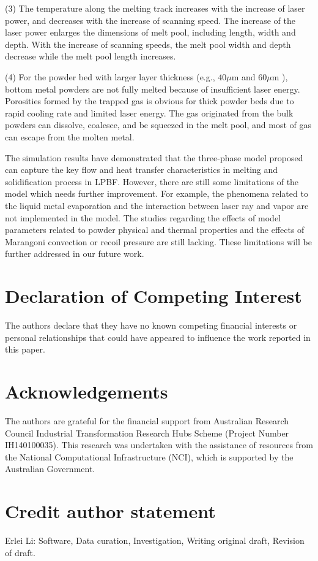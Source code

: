 \documentclass[10pt]{article}
\begin{document}
(3) The temperature along the melting track increases with the increase of laser power, and decreases with the increase of scanning speed. The increase of the laser power enlarges the dimensions of melt pool, including length, width and depth. With the increase of scanning speeds, the melt pool width and depth decrease while the melt pool length increases.

(4) For the powder bed with larger layer thickness (e.g., $40 \mu \mathrm{m}$ and $60 \mu \mathrm{m}$ ), bottom metal powders are not fully melted because of insufficient laser energy. Porosities formed by the trapped gas is obvious for thick powder beds due to rapid cooling rate and limited laser energy. The gas originated from the bulk powders can dissolve, coalesce, and be squeezed in the melt pool, and most of gas can escape from the molten metal.

The simulation results have demonstrated that the three-phase model proposed can capture the key flow and heat transfer characteristics in melting and solidification process in LPBF. However, there are still some limitations of the model which needs further improvement. For example, the phenomena related to the liquid metal evaporation and the interaction between laser ray and vapor are not implemented in the model. The studies regarding the effects of model parameters related to powder physical and thermal properties and the effects of Marangoni convection or recoil pressure are still lacking. These limitations will be further addressed in our future work.

\section*{Declaration of Competing Interest}
The authors declare that they have no known competing financial interests or personal relationships that could have appeared to influence the work reported in this paper.

\section*{Acknowledgements}
The authors are grateful for the financial support from Australian Research Council Industrial Transformation Research Hubs Scheme (Project Number IH140100035). This research was undertaken with the assistance of resources from the National Computational Infrastructure (NCI), which is supported by the Australian Government.

\section*{Credit author statement}
Erlei Li: Software, Data curation, Investigation, Writing original draft, Revision of draft.
\end{document}

